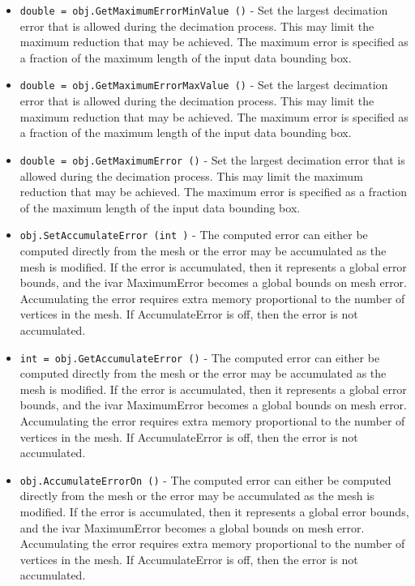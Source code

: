 \begin{itemize}
\item  \verb|double = obj.GetMaximumErrorMinValue ()| -  Set the largest decimation error that is allowed during the decimation
 process. This may limit the maximum reduction that may be achieved. The
 maximum error is specified as a fraction of the maximum length of
 the input data bounding box.

\item  \verb|double = obj.GetMaximumErrorMaxValue ()| -  Set the largest decimation error that is allowed during the decimation
 process. This may limit the maximum reduction that may be achieved. The
 maximum error is specified as a fraction of the maximum length of
 the input data bounding box.

\item  \verb|double = obj.GetMaximumError ()| -  Set the largest decimation error that is allowed during the decimation
 process. This may limit the maximum reduction that may be achieved. The
 maximum error is specified as a fraction of the maximum length of
 the input data bounding box.

\item  \verb|obj.SetAccumulateError (int )| -  The computed error can either be computed directly from the mesh
 or the error may be accumulated as the mesh is modified. If the error
 is accumulated, then it represents a global error bounds, and the ivar
 MaximumError becomes a global bounds on mesh error. Accumulating the
 error requires extra memory proportional to the number of vertices in
 the mesh. If AccumulateError is off, then the error is not accumulated.

\item  \verb|int = obj.GetAccumulateError ()| -  The computed error can either be computed directly from the mesh
 or the error may be accumulated as the mesh is modified. If the error
 is accumulated, then it represents a global error bounds, and the ivar
 MaximumError becomes a global bounds on mesh error. Accumulating the
 error requires extra memory proportional to the number of vertices in
 the mesh. If AccumulateError is off, then the error is not accumulated.

\item  \verb|obj.AccumulateErrorOn ()| -  The computed error can either be computed directly from the mesh
 or the error may be accumulated as the mesh is modified. If the error
 is accumulated, then it represents a global error bounds, and the ivar
 MaximumError becomes a global bounds on mesh error. Accumulating the
 error requires extra memory proportional to the number of vertices in
 the mesh. If AccumulateError is off, then the error is not accumulated.


\end{itemize}
